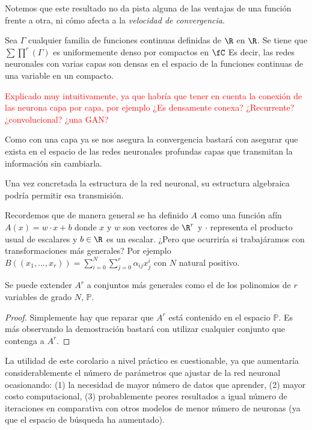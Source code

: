Notemos que este resultado no da pista alguna de las ventajas de una función frente a otra,
 ni cómo afecta a la \textit{velocidad de convergencia}. 

\begin{corolario}

    Sea $\Gamma$ cualquier familia de funciones continuas definidas de $\R$ en $\R$. 
    Se tiene que $\sum \prod ^r (\Gamma)$ es uniformemente denso por compactos en $\fC$  
    Es decir, las redes neuronales con varias capas son densas en el  espacio de la funciones continuas de una variable en un compacto. 
\end{corolario}

    \textcolor{red}{Explicado muy intuitivamente, ya que habría que tener en cuenta la conexión de las neurona 
    capa por capa, por ejemplo ¿Es densamente conexa? ¿Recurrente? ¿convolucional? ¿una GAN?}

    Como con una capa ya se nos asegura la convergencia bastará con asegurar que exista 
    en el espacio de las redes neuronales profundas capas que transmitan la información sin cambiarla. 

    Una vez concretada la estructura de la red neuronal,  su estructura algebraica podría permitir esa transmisión. 


Recordemos que de manera general se ha definido $A$ como una función afín 
$A(x) = w \cdot x + b$ donde $x$ y $w$ son vectores de $\R^r$ y $\cdot$ representa el producto 
usual de escalares y $b \in \R$ es un escalar.  ¿Pero que ocurriría si trabajáramos con transformaciones más generales?  
Por ejemplo $B((x_1, ..., x_r)) = \sum_{i= 0} ^N \sum_{j= 0} ^r \alpha_{ij} x_j^i$  con $N$ natural positivo. 

\begin{corolario}[Generalización de A]  

    Se puede extender $A^r$ a conjuntos más generales como el de los polinomios de $r$ variables de grado $N$, $\mathbb{P}$.  
\end{corolario}
\begin{proof}
    Simplemente hay que reparar que $A^r$ está contenido en el espacio $\mathbb{P}$. 
    Es más observando la demostración bastará con utilizar cualquier conjunto que contenga a $A^r$. 
\end{proof}

La utilidad de este corolario a nivel práctico es cuestionable, ya que aumentaría considerablemente el número de 
parámetros que ajustar de la red neuronal ocasionando: (1) la necesidad de mayor número de datos que aprender, 
(2) mayor costo computacional, (3) probablemente peores resultados a igual número de iteraciones en comparativa 
con otros modelos de menor número de neuronas (ya que el espacio de búsqueda ha aumentado).

